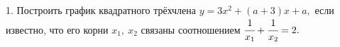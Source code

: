 1. Построить график квадратного трёхчлена $y=3x^2+(a+3)x+a,$ если известно,
что его корни $x_1,\ x_2$ связаны соотношением $\cfrac{1}{x_1}+\cfrac{1}{x_2}=2.$\\
